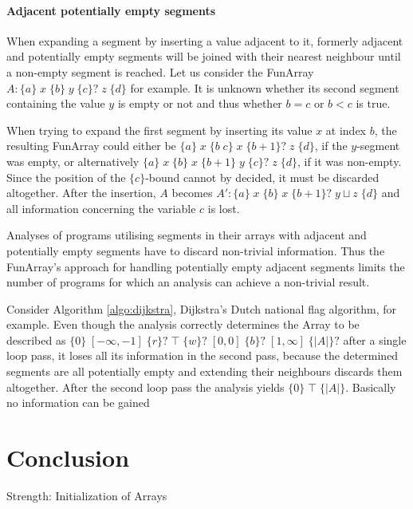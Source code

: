 \documentclass{report}
\newcommand{\funArray}[1]{$#1$}
\newcommand{\bound}[1]{\{#1\}}
\newcommand{\fvalue}[1]{\;#1\;}
\begin{document}
\subsubsection{Adjacent potentially empty segments}
When expanding a segment by inserting a value adjacent to it, formerly adjacent and potentially empty segments will be joined with their nearest neighbour until a non-empty segment is reached. Let us consider the FunArray \funArray{A:\bound{a} \fvalue{x} \bound{b} \fvalue{y} \bound{c}? \fvalue{z} \bound{d}} for example. It is unknown whether its second segment containing the value $y$ is empty or not and thus whether $b=c$ or $b<c$ is true.

When trying to expand the first segment by inserting its value $x$ at index $b$, the resulting FunArray could either be \funArray{\bound{a} \fvalue{x} \bound{b\;c} \fvalue{x} \bound{b+1}? \fvalue{z} \bound{d}}, if the $y$-segment was empty, or alternatively \funArray{\bound{a} \fvalue{x} \bound{b} \fvalue{x} \bound{b+1} \fvalue{y} \bound{c}? \fvalue{z} \bound{d}}, if it was non-empty. Since the position of the \funArray{\bound{c}}-bound cannot by decided, it must be discarded altogether. After the insertion, $A$ becomes \funArray{A':\bound{a} \fvalue{x} \bound{b} \fvalue{x} \bound{b+1}? \fvalue{y\sqcup z} \bound{d}} and all information concerning the variable $c$ is lost.

 Analyses of programs utilising segments in their arrays with adjacent and potentially empty segments have to discard non-trivial information. Thus the FunArray's approach for handling potentially empty adjacent segments limits the number of programs for which an analysis can achieve a non-trivial result.
 
 Consider Algorithm \ref{algo:dijkstra}, Dijkstra's Dutch national flag algorithm, for example. Even though the analysis correctly determines the Array to be described as $\bound{0} \fvalue{[-\infty, -1]} \bound{r}? \fvalue{\top} \bound{w}? \fvalue{[0, 0]} \bound{b}? \fvalue{[1, \infty]}  \bound{|A|}?$ after a single loop pass, it loses all its information in the second pass, because the determined segments are all potentially empty and extending their neighbours discards them altogether. After the second loop pass the analysis yields $\bound{0} \fvalue{\top} \bound{|A|}$. Basically no information can be gained   
 



\chapter{Conclusion}

Strength: Initialization of Arrays




\newpage


\end{document}
